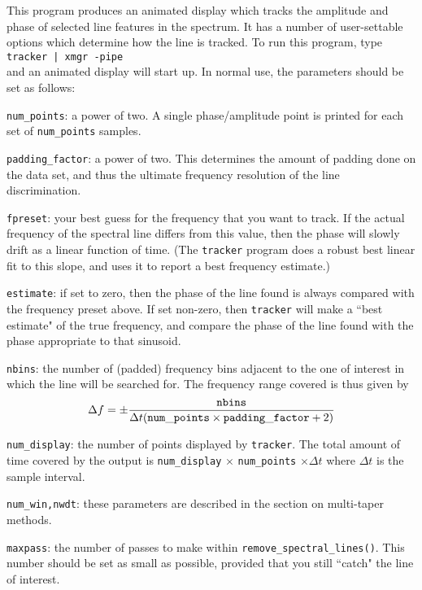 This program produces an animated display which tracks the amplitude and phase
of selected line features in the spectrum.  It has a number of user-settable options
which determine how the line is tracked.  To run this program, type\\
{\tt tracker | xmgr -pipe}\\
and an animated display will start up. In normal use, the parameters should be
set as follows:
\begin{description}
\item{\tt num\_points}: a power of two.  A single phase/amplitude point is printed for
   each set of {\tt num\_points} samples.
\item{\tt padding\_factor}: a power of two.  This determines the amount of padding done on
   the data set, and thus the ultimate frequency resolution of the line discrimination.
\item{\tt fpreset}: your best guess for the frequency that you want to track.  If the actual
   frequency of the spectral line differs from this value, then the phase will slowly
   drift as a linear function of time.  (The {\tt tracker} program does a robust
   best linear fit to this slope, and uses it to report a best frequency estimate.)
\item{\tt estimate}: if set to zero, then the phase of the line found is always compared with
   the frequency preset above.  If set non-zero, then {\tt tracker} will make a ``best
   estimate" of the true frequency, and compare the phase of the line found with the phase
   appropriate to that sinusoid.
\item{\tt nbins}: the number of (padded) frequency bins adjacent to the one of interest
   in which the line will be searched for.  The frequency range covered is thus given 
   by
   \begin{equation}
   \Delta f = \pm {{\tt nbins} \over \Delta t  ({\tt num\_points} \times {\tt padding\_factor}+2)}
   \end{equation}
\item{\tt num\_display}: the number of points displayed by {\tt tracker}.
   The total amount of time covered by the output is {\tt num\_display}
   $\times$ {\tt num\_points} $\times \Delta t$ where $\Delta t$ is the
   sample interval.
\item{\tt num\_win,nwdt}: these parameters are described in the section on multi-taper methods.
\item{\tt maxpass}: the number of passes to make within {\tt remove\_spectral\_lines()}.
   This number should be set as small as possible, provided that you still ``catch" the
   line of interest.
\end{description}

